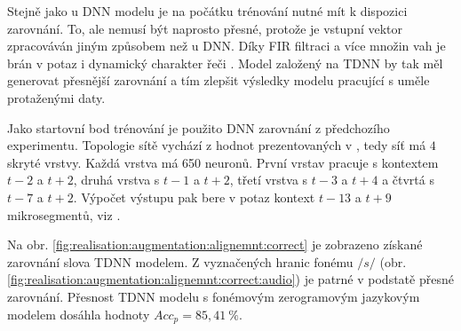 
Stejně jako u DNN modelu je na počátku trénování nutné mít k dispozici zarovnání. To, ale nemusí být naprosto přesné, protože je vstupní vektor zpracováván jiným způsobem než u DNN. Díky FIR filtraci a více množin vah je brán v potaz i dynamický charakter řeči \cite{Peddinti2015}. Model založený na TDNN by tak měl generovat přesnější zarovnání a tím zlepšit výsledky modelu pracující s uměle protaženými daty.

Jako startovní bod trénování je použito DNN zarovnání z předchozího experimentu. Topologie sítě vychází z hodnot prezentovaných v \cite{Peddinti2015}, tedy síť má $4$ skryté vrstvy. Každá vrstva má 650 neuronů. První vrstav pracuje s kontextem $t-2$ a $t+2$, druhá vrstva s $t-1$ a $t+2$, třetí vrstva s $t-3$ a $t+4$ a čtvrtá s $t-7$ a $t+2$. Výpočet výstupu pak bere v potaz kontext $t-13$ a $t+9$ mikrosegmentů, viz \cite{Peddinti2015}.


Na obr. \ref{fig:realisation:augmentation:alignemnt:correct} je zobrazeno získané zarovnání slova  TDNN modelem. Z vyznačených hranic fonému $/s/$ (obr. \ref{fig:realisation:augmentation:alignemnt:correct:audio}) je patrné v podstatě přesné zarovnání. Přesnost TDNN modelu s fonémovým zerogramovým jazykovým modelem dosáhla hodnoty $Acc_{p}= 85,41\ \%$.

